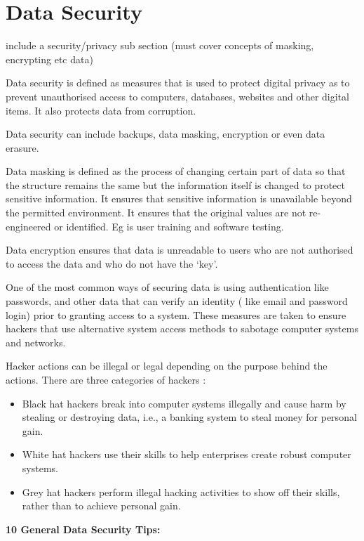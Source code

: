 \documentclass[]{book}
\providecommand{\tightlist}{%
  \setlength{\itemsep}{0pt}\setlength{\parskip}{0pt}}
\theoremstyle{definition}
\theoremstyle{definition}
\theoremstyle{remark}
\begin{document}
\section{Data Security}\label{data-security}

include a security/privacy sub section (must cover concepts of masking,
encrypting etc data)

Data security is defined as measures that is used to protect digital
privacy as to prevent unauthorised access to computers, databases,
websites and other digital items. It also protects data from corruption.

Data security can include backups, data masking, encryption or even data
erasure.

Data masking is defined as the process of changing certain part of data
so that the structure remains the same but the information itself is
changed to protect sensitive information. It ensures that sensitive
information is unavailable beyond the permitted environment. It ensures
that the original values are not re-engineered or identified. Eg is user
training and software testing.

Data encryption ensures that data is unreadable to users who are not
authorised to access the data and who do not have the `key'.

One of the most common ways of securing data is using authentication
like passwords, and other data that can verify an identity ( like email
and password login) prior to granting access to a system. These measures
are taken to ensure hackers that use alternative system access methods
to sabotage computer systems and networks.

Hacker actions can be illegal or legal depending on the purpose behind
the actions. There are three categories of hackers :

\begin{itemize}
\tightlist
\item
  Black hat hackers break into computer systems illegally and cause harm
  by stealing or destroying data, i.e., a banking system to steal money
  for personal gain.
\item
  White hat hackers use their skills to help enterprises create robust
  computer systems.
\item
  Grey hat hackers perform illegal hacking activities to show off their
  skills, rather than to achieve personal gain.
\end{itemize}

\textbf{10 General Data Security Tips:}
\end{document}
